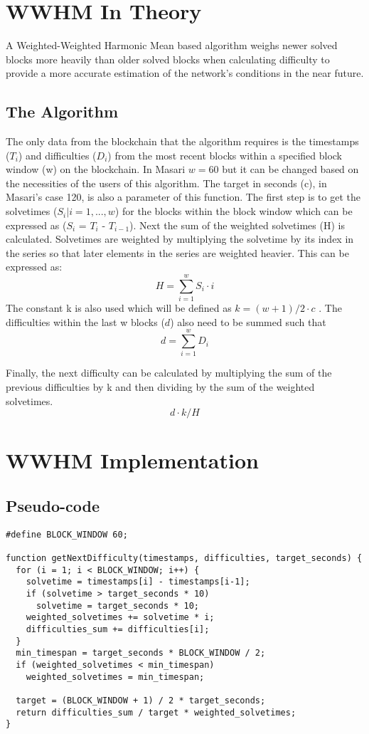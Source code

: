 \documentclass{article}
\begin{document}
\section{WWHM In Theory}
A Weighted-Weighted
Harmonic Mean based algorithm weighs
newer solved blocks more heavily than
older solved blocks when calculating
difficulty to provide a more accurate
estimation of the network's conditions in
the near future.
\subsection{The Algorithm}
The only data
from the blockchain that the algorithm
requires is the timestamps ($T_{i}$) and
difficulties ($D_{i}$) from the most recent
blocks within a specified block window (w)
on the blockchain. In Masari $w = 60$ but it can be changed based on the necessities of the users of this algorithm. The target in seconds (c), in Masari's case 120, is also a parameter of this function. The first step is to get
the solvetimes ($S_{i} | i = 1 ,...,w$) for the blocks
within the block window which can be
expressed as ($S_{i}$ = $T_{i}$ - $T_{i-1}$). Next the sum of the weighted solvetimes (H) is calculated. Solvetimes are weighted by multiplying the solvetime by its index in the series so that later elements in the series are weighted heavier. This can be expressed as: 
$$H = \sum_{i=1}^{w} S_{i}\cdot i$$
The constant k is also used which will be defined as $k = (w+1)/2\cdot c$ .
The difficulties within the last w blocks ($d$) also need to be summed such that $$d = \sum_{i=1}^{w}D_i$$

Finally, the next difficulty can be calculated by multiplying the sum of the previous difficulties by k and then dividing by the sum of the weighted solvetimes.
 $$d\cdot k / H$$
 
\section{WWHM Implementation}
\subsection{Pseudo-code}
\lstset {language=C}
\begin{lstlisting}
#define BLOCK_WINDOW 60;

function getNextDifficulty(timestamps, difficulties, target_seconds) {
  for (i = 1; i < BLOCK_WINDOW; i++) {
    solvetime = timestamps[i] - timestamps[i-1];
    if (solvetime > target_seconds * 10)
      solvetime = target_seconds * 10;
    weighted_solvetimes += solvetime * i;
    difficulties_sum += difficulties[i];
  }
  min_timespan = target_seconds * BLOCK_WINDOW / 2;
  if (weighted_solvetimes < min_timespan)
    weighted_solvetimes = min_timespan;
  
  target = (BLOCK_WINDOW + 1) / 2 * target_seconds;
  return difficulties_sum / target * weighted_solvetimes;
}

\end{lstlisting}
\end{document}
